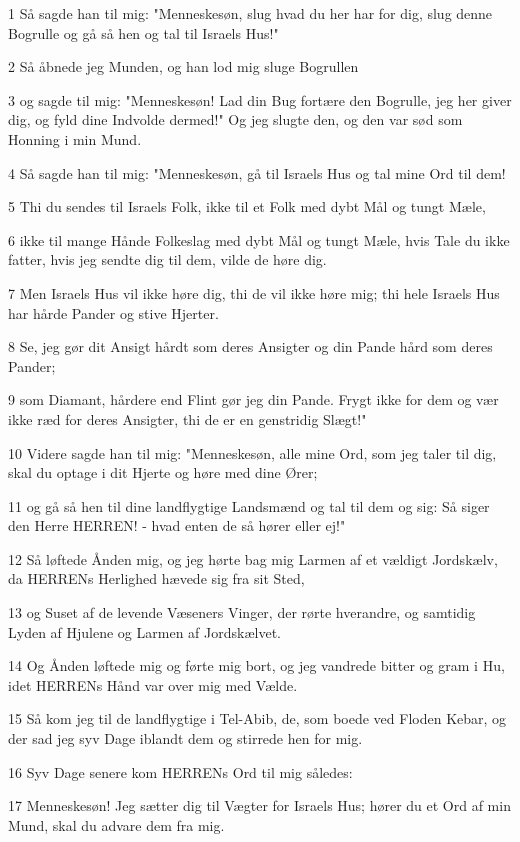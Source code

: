\par 1 Så sagde han til mig: "Menneskesøn, slug hvad du her har for dig, slug denne Bogrulle og gå så hen og tal til Israels Hus!"
\par 2 Så åbnede jeg Munden, og han lod mig sluge Bogrullen
\par 3 og sagde til mig: "Menneskesøn! Lad din Bug fortære den Bogrulle, jeg her giver dig, og fyld dine Indvolde dermed!" Og jeg slugte den, og den var sød som Honning i min Mund.
\par 4 Så sagde han til mig: "Menneskesøn, gå til Israels Hus og tal mine Ord til dem!
\par 5 Thi du sendes til Israels Folk, ikke til et Folk med dybt Mål og tungt Mæle,
\par 6 ikke til mange Hånde Folkeslag med dybt Mål og tungt Mæle, hvis Tale du ikke fatter, hvis jeg sendte dig til dem, vilde de høre dig.
\par 7 Men Israels Hus vil ikke høre dig, thi de vil ikke høre mig; thi hele Israels Hus har hårde Pander og stive Hjerter.
\par 8 Se, jeg gør dit Ansigt hårdt som deres Ansigter og din Pande hård som deres Pander;
\par 9 som Diamant, hårdere end Flint gør jeg din Pande. Frygt ikke for dem og vær ikke ræd for deres Ansigter, thi de er en genstridig Slægt!"
\par 10 Videre sagde han til mig: "Menneskesøn, alle mine Ord, som jeg taler til dig, skal du optage i dit Hjerte og høre med dine Ører;
\par 11 og gå så hen til dine landflygtige Landsmænd og tal til dem og sig: Så siger den Herre HERREN! - hvad enten de så hører eller ej!"
\par 12 Så løftede Ånden mig, og jeg hørte bag mig Larmen af et vældigt Jordskælv, da HERRENs Herlighed hævede sig fra sit Sted,
\par 13 og Suset af de levende Væseners Vinger, der rørte hverandre, og samtidig Lyden af Hjulene og Larmen af Jordskælvet.
\par 14 Og Ånden løftede mig og førte mig bort, og jeg vandrede bitter og gram i Hu, idet HERRENs Hånd var over mig med Vælde.
\par 15 Så kom jeg til de landflygtige i Tel-Abib, de, som boede ved Floden Kebar, og der sad jeg syv Dage iblandt dem og stirrede hen for mig.
\par 16 Syv Dage senere kom HERRENs Ord til mig således:
\par 17 Menneskesøn! Jeg sætter dig til Vægter for Israels Hus; hører du et Ord af min Mund, skal du advare dem fra mig.
